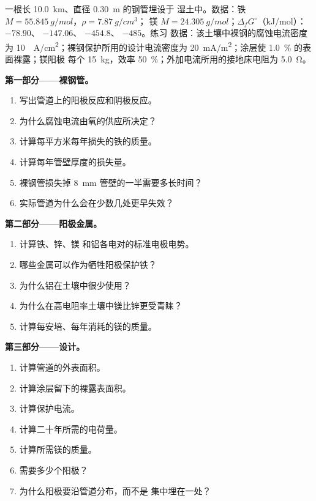 \begin{problem}
\label{pb:b2:corrosion:1}
一根长 \qty{10.0}{km}、直径 \qty{0.30}{m} 的钢管埋设于
湿土中。数据：铁 $M = \qty{55.845}{g/mol}$，$\rho = \qty{7.87}{g/cm^3}$；
镁 $M = \qty{24.305}{g/mol}$；$\Delta_f G^\circ$（\unit{kJ/mol}）：
$-78.90$、 $-147.06$、 $-454.8$、 $-485$。练习
数据：该土壤中裸钢的腐蚀电流密度为 \qty{10}{\micro
A/cm^2}；裸钢保护所用的设计电流密度为
\qty{20}{mA/m^2}；涂层使 1.0~\% 的表面裸露；镁阳极
每个 \qty{15}{kg}，效率 50~\%；外加电流所用的接地床电阻为
\qty{5.0}{\ohm}。

\medskip
\noindent\textbf{第一部分——裸钢管。}
\begin{enumerate}
  \item 写出管道上的阳极反应和阴极反应。
  \item 为什么腐蚀电流由氧的供应所决定？
  \item 计算每平方米每年损失的铁的质量。
  \item 计算每年管壁厚度的损失量。
  \item 裸钢管损失掉 \qty{8}{mm} 管壁的一半需要多长时间？
  \item 实际管道为什么会在少数几处更早失效？
\end{enumerate}

\medskip
\noindent\textbf{第二部分——阳极金属。}
\begin{enumerate}[resume]
  \item 计算铁、锌、镁
        和铝各电对的标准电极电势。
  \item 哪些金属可以作为牺牲阳极保护铁？
  \item 为什么铝在土壤中很少使用？
  \item 为什么在高电阻率土壤中镁比锌更受青睐？
  \item 计算每安培、每年消耗的镁的质量。
\end{enumerate}

\medskip
\noindent\textbf{第三部分——设计。}
\begin{enumerate}[resume]
  \item 计算管道的外表面积。
  \item 计算涂层留下的裸露表面积。
  \item 计算保护电流。
  \item 计算二十年所需的电荷量。
  \item 计算所需镁的质量。
  \item 需要多少个阳极？
  \item 为什么阳极要沿管道分布，而不是
        集中埋在一处？
\end{enumerate}


\end{problem}
